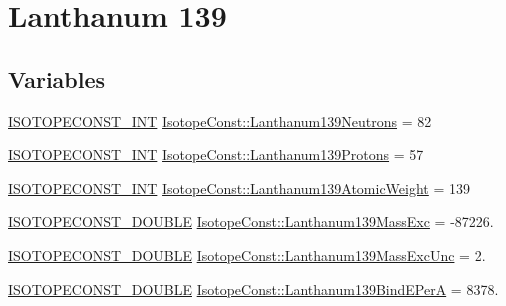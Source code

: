 \hypertarget{group___isotope_const-_lanthanum-_la139}{}\section{Lanthanum 139}
\label{group___isotope_const-_lanthanum-_la139}
\subsection*{Variables}
\begin{DoxyCompactItemize}
\item 
\mbox{\hyperlink{group___isotope_const-_macros_ga5f18360b3e99483a35c32d789e62621c}{I\+S\+O\+T\+O\+P\+E\+C\+O\+N\+S\+T\+\_\+\+I\+NT}} \mbox{\hyperlink{group___isotope_const-_lanthanum-_la139_ga2ca9bc791b80033657c8dae325e41e0b}{Isotope\+Const\+::\+Lanthanum139\+Neutrons}} = 82
\item 
\mbox{\hyperlink{group___isotope_const-_macros_ga5f18360b3e99483a35c32d789e62621c}{I\+S\+O\+T\+O\+P\+E\+C\+O\+N\+S\+T\+\_\+\+I\+NT}} \mbox{\hyperlink{group___isotope_const-_lanthanum-_la139_ga2a2989e1ffbf10a8d621f41aae403306}{Isotope\+Const\+::\+Lanthanum139\+Protons}} = 57
\item 
\mbox{\hyperlink{group___isotope_const-_macros_ga5f18360b3e99483a35c32d789e62621c}{I\+S\+O\+T\+O\+P\+E\+C\+O\+N\+S\+T\+\_\+\+I\+NT}} \mbox{\hyperlink{group___isotope_const-_lanthanum-_la139_ga04d2f9ea6c0ada4bba510fa69957f4b9}{Isotope\+Const\+::\+Lanthanum139\+Atomic\+Weight}} = 139
\item 
\mbox{\hyperlink{group___isotope_const-_macros_ga8f45a7272ce02c0b4c65c44636ed719a}{I\+S\+O\+T\+O\+P\+E\+C\+O\+N\+S\+T\+\_\+\+D\+O\+U\+B\+LE}} \mbox{\hyperlink{group___isotope_const-_lanthanum-_la139_ga42361556f25e53bc741b65166a6eaea3}{Isotope\+Const\+::\+Lanthanum139\+Mass\+Exc}} = -\/87226.
\item 
\mbox{\hyperlink{group___isotope_const-_macros_ga8f45a7272ce02c0b4c65c44636ed719a}{I\+S\+O\+T\+O\+P\+E\+C\+O\+N\+S\+T\+\_\+\+D\+O\+U\+B\+LE}} \mbox{\hyperlink{group___isotope_const-_lanthanum-_la139_gab1a74902918a8ce62e0b8b7168eb7bc7}{Isotope\+Const\+::\+Lanthanum139\+Mass\+Exc\+Unc}} = 2.
\item 
\mbox{\hyperlink{group___isotope_const-_macros_ga8f45a7272ce02c0b4c65c44636ed719a}{I\+S\+O\+T\+O\+P\+E\+C\+O\+N\+S\+T\+\_\+\+D\+O\+U\+B\+LE}} \mbox{\hyperlink{group___isotope_const-_lanthanum-_la139_ga14af8393fe3b2a57e3b70d61f5fc95e7}{Isotope\+Const\+::\+Lanthanum139\+Bind\+E\+PerA}} = 8378.
\item 

\end{DoxyCompactItemize}
